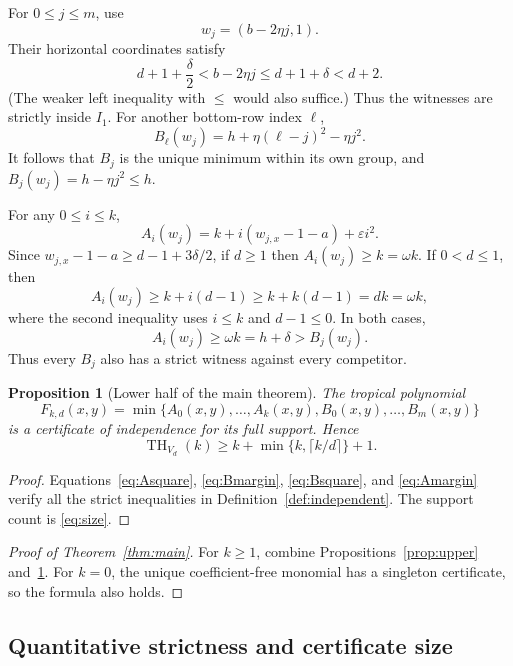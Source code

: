 \documentclass[11pt,a4paper]{article}
\numberwithin{equation}{section}
\newtheorem{proposition}[theorem]{Proposition}
\theoremstyle{definition}
\theoremstyle{remark}
\newcommand{\tHilb}{\operatorname{TH}}
\begin{document}
For $0\leq j\leq m$, use
\begin{equation}
\label{eq:Bwit}
w_j=(b-2\eta j,1).
\end{equation}
Their horizontal coordinates satisfy
\[
d+1+\frac\delta2<b-2\eta j\leq d+1+\delta<d+2.
\]
(The weaker left inequality with $\leq$ would also suffice.) Thus the witnesses
are strictly inside $I_1$.
For another bottom-row index $\ell$,
\begin{equation}
\label{eq:Bsquare}
B_\ell(w_j)=h+\eta(\ell-j)^2-\eta j^2.
\end{equation}
It follows that $B_j$ is the unique minimum within its own group, and
$B_j(w_j)=h-\eta j^2\leq h$.

For any $0\leq i\leq k$,
\begin{equation}
\label{eq:Alower}
A_i(w_j)=k+i(w_{j,x}-1-a)+\varepsilon i^2.
\end{equation}
Since $w_{j,x}-1-a\geq d-1+3\delta/2$, if $d\geq1$ then
$A_i(w_j)\geq k=\omega k$. If $0<d\leq1$, then
\[
A_i(w_j)\geq k+i(d-1)\geq k+k(d-1)=dk=\omega k,
\]
where the second inequality uses $i\leq k$ and $d-1\leq0$.
In both cases,
\begin{equation}
\label{eq:Amargin}
A_i(w_j)\geq\omega k=h+\delta>B_j(w_j).
\end{equation}
Thus every $B_j$ also has a strict witness against every competitor.

\begin{proposition}[Lower half of the main theorem]
\label{prop:lower}
The tropical polynomial
\[
F_{k,d}(x,y)=\min\{A_0(x,y),\ldots,A_k(x,y),B_0(x,y),\ldots,B_m(x,y)\}
\]
is a certificate of independence for its full support. Hence
\[
\tHilb_{V_d}(k)\geq k+\min\{k,\lceil k/d\rceil\}+1.
\]
\end{proposition}

\begin{proof}
Equations~\eqref{eq:Asquare}, \eqref{eq:Bmargin}, \eqref{eq:Bsquare}, and
\eqref{eq:Amargin} verify all the strict inequalities in
Definition~\ref{def:independent}. The support count is \eqref{eq:size}.
\end{proof}

\begin{proof}[Proof of Theorem~\ref{thm:main}]
For $k\geq1$, combine Propositions~\ref{prop:upper} and~\ref{prop:lower}.
For $k=0$, the unique coefficient-free monomial has a singleton certificate,
so the formula also holds.
\end{proof}

\subsection{Quantitative strictness and certificate size}
\end{document}
